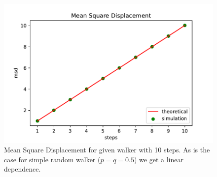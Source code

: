 \documentclass[showpacs,amsmath,amssymb,aps,pre,twocolumn]{revtex4-1}
\begin{document}









\begin{figure}[H]
    \centering
    \includegraphics[scale=0.60]{msd.pdf}
    \caption{Mean Square Displacement for given walker with 10 steps. As is the case for simple random walker ($p=q=0.5$) we get a linear dependence.}
    \label{fig:my_label}
\end{figure}
\end{document}
